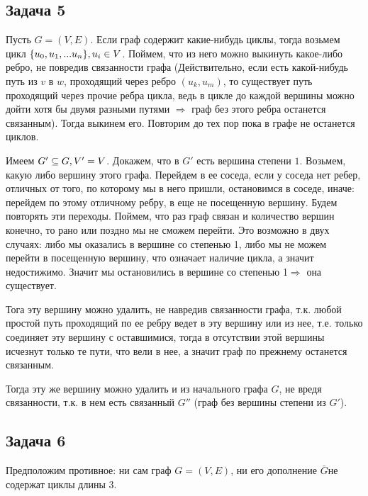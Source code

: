 \documentclass{article}
\begin{document}
\begin{center}
	\subsection*{Задача 5}
\end{center}

Пусть $ G = (V, E) $. 
Если граф содержит какие-нибудь циклы, тогда возьмем цикл $ \{u_0, u_1, ... u_n\},\space u_i \in V$. Поймем, что из него можно выкинуть какое-либо ребро, не повредив связанности графа (Действительно, если есть какой-нибудь путь из $v $ в $w$, проходящий через ребро $ (u_k, u_m) $, то существует путь проходящий через прочие ребра цикла, ведь в цикле до каждой вершины можно дойти хотя бы двумя разными путями $\Rightarrow$ граф без этого ребра останется связанным). Тогда выкинем его. Повторим до тех пор пока в графе не останется циклов. 

Имеем $ G' \subseteq G,\space V' = V $. 
Докажем, что в $ G' $ есть вершина степени $ 1 $.
Возьмем, какую либо вершину этого графа. Перейдем в ее соседа, если у соседа нет ребер, отличных от того, по которому мы в него пришли, остановимся в соседе, иначе: перейдем по этому отличному ребру, в еще не посещенную вершину. Будем повторять эти переходы. Поймем, что раз граф связан и количество вершин конечно, то рано или поздно мы не сможем перейти. Это возможно в двух случаях: либо мы оказались в вершине со степенью 1, либо мы не можем перейти в посещенную вершину, что означает наличие цикла, а значит недостижимо. Значит мы остановились в вершине со степенью 1$\Rightarrow$ она существует.

Тога эту вершину можно удалить, не навредив связанности графа, т.к. любой простой путь проходящий по ее ребру ведет в эту вершину или из нее, т.е. только соединяет эту вершину с оставшимися, тогда в отсутствии этой вершины исчезнут только те пути, что вели в нее, а значит граф по прежнему останется связанным.

Тогда эту же вершину можно удалить и из начального графа $G$, не вредя связанности, т.к. в нем есть связанный $G''$ (граф без вершины степени из $G'$). 
\begin{center}
	\subsection*{Задача 6}
\end{center}
Предположим противное: ни сам граф $ G = (V, E) $, ни его дополнение $ \bar{G} $не содержат циклы длины $ 3 $.
\end{document}
